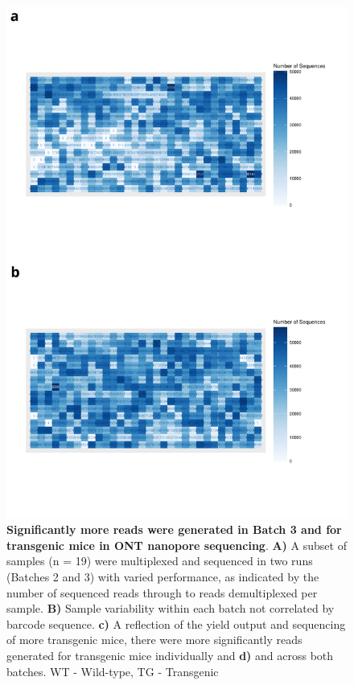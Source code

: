\begin{figure}[!htp]
	\centering
	\includegraphics[page=4,trim={0 0 0 0},clip,scale = 0.55]{Figures/ONTTargetedTranscriptome.pdf}
	\captionsetup{width=0.95\textwidth}
	\caption[ONT Targeted Transcriptome run performance]%
	{\textbf{Significantly more reads were generated in Batch 3 and for transgenic mice in ONT nanopore sequencing}. \textbf{A)} A subset of samples (n = 19) were multiplexed and sequenced in two runs (Batches 2 and 3) with varied performance, as indicated by the number of sequenced reads through to reads demultiplexed per sample. \textbf{B)} Sample variability within each batch not correlated by barcode sequence. \textbf{c)} A reflection of the yield output and sequencing of more transgenic mice, there were more significantly reads generated for transgenic mice individually and \textbf{d)} and across both batches. WT - Wild-type, TG - Transgenic }
	\label{fig:ONT_targeted_run_output}
\end{figure}

